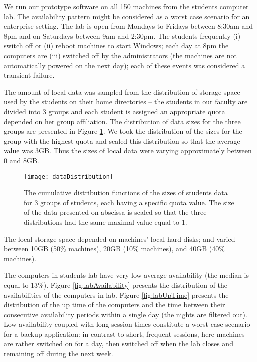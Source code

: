 \documentclass[10pt, final, conference, letterpaper]{IEEEtran}
\begin{document}
We run our prototype software on all 150 machines from the students computer lab. The availability pattern might be considered as a worst case scenario for an enterprise setting. 
The lab is open from Mondays to Fridays between 8:30am and 8pm and on Saturdays between 9am and 2:30pm. The students frequently (i) switch off or (ii) reboot machines to start Windows; each day at 8pm the computers are (iii) switched off by the administrators (the machines are not automatically powered on the next day); each of these events was considered a transient failure. 

The amount of local data was sampled from the distribution of storage space used by the students on their home directories -- the students in our faculty are divided into 3 groups and each student is assigned an appropriate quota depended on her group affiliation. The distribution of data sizes for the three groups are presented in Figure \ref{fig:dataDistribution}.
We took the distribution of the sizes for the group with the highest quota and scaled this distribution so that the average value was 3GB. Thus the sizes of local data were varying approximately between 0 and 8GB.

\begin{figure}[tb]
     \begin{center}
         \texttt{[image: dataDistribution]}
     \end{center}
     \caption{The cumulative distribution functions of the sizes of students data for 3 groups of students, each having a specific quota value. The size of the data presented on abscissa is scaled so that the three distributions had the same maximal value equal to 1.}
     \label{fig:dataDistribution}
 \end{figure}

The local storage space depended on machines' local hard disks; and varied between 10GB (50\% machines), 20GB (10\% machines), and 40GB (40\% machines).



The computers in students lab have very low average availability (the median is equal to 13\%). Figure \ref{fig:labAvailability} presents the distribution of the availabilities of the computers in lab. Figure \ref{fig:labUpTime} presents the distribution of the up time of the computers and the time between their consecutive availability periods within a single day (the nights are filtered out). Low availability coupled with long session times constitute a worst-case scenario for a backup application: in contrast to short, frequent sessions, here machines are rather switched on for a day, then switched off when the lab closes and remaining off during the next week.
\end{document}

